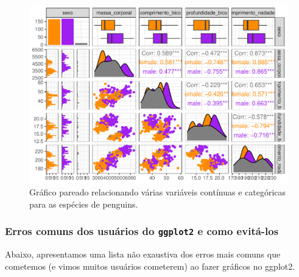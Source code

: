\documentclass[
]{article}
\begin{document}
\begin{figure}
\centering
\includegraphics{epr_files/figure-latex/fig-pairs-cont-cat-1.pdf}
\caption{\label{fig:fig-pairs-cont-cat}Gráfico pareado relacionando várias variáveis contínuas e categóricas para as espécies de penguins.}
\end{figure}

\hypertarget{erros-comuns-dos-usuuxe1rios-do-ggplot2-e-como-evituxe1-los}{%
\subsubsection{\texorpdfstring{Erros comuns dos usuários do \texttt{ggplot2} e como evitá-los}{Erros comuns dos usuários do ggplot2 e como evitá-los}}\label{erros-comuns-dos-usuuxe1rios-do-ggplot2-e-como-evituxe1-los}}

Abaixo, apresentamos uma lista não exaustiva dos erros mais comuns que cometemos (e vimos muitos usuários cometerem) ao fazer gráficos no ggplot2.
\end{document}
